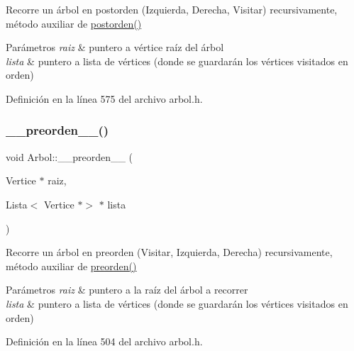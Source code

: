 Recorre un árbol en postorden (Izquierda, Derecha, Visitar) recursivamente, método auxiliar de \hyperlink{classArbol_a126e7d801dbe214ac39f183c26e9135d}{postorden()} 


\begin{DoxyParams}{Parámetros}
{\em raiz} & puntero a vértice raíz del árbol \\
\hline
{\em lista} & puntero a lista de vértices (donde se guardarán los vértices visitados en orden) \\
\hline
\end{DoxyParams}


Definición en la línea 575 del archivo arbol.\+h.

\mbox{\label{classArbol_a707f748c57d51f6b63fe1a605476e49d}} 
\subsubsection{\texorpdfstring{\+\_\+\+\_\+preorden\+\_\+\+\_\+()}{\_\_preorden\_\_()}}
{\footnotesize\ttfamily void Arbol\+::\+\_\+\+\_\+preorden\+\_\+\+\_\+ (\begin{DoxyParamCaption}\item[{Vertice $\ast$}]{raiz,  }\item[{Lista$<$ Vertice $\ast$$>$ $\ast$}]{lista }\end{DoxyParamCaption})\hspace{0.3cm}{\ttfamily [protected]}}



Recorre un árbol en preorden (Visitar, Izquierda, Derecha) recursivamente, método auxiliar de \hyperlink{classArbol_a0ffdc60ce8f2267366681cc94cf6beea}{preorden()} 


\begin{DoxyParams}{Parámetros}
{\em raiz} & puntero a la raíz del árbol a recorrer \\
\hline
{\em lista} & puntero a lista de vértices (donde se guardarán los vértices visitados en orden) \\
\hline
\end{DoxyParams}


Definición en la línea 504 del archivo arbol.\+h.

\mbox{\label{classArbol_a60b71d79b81a3a1083709ec264332975}} 
